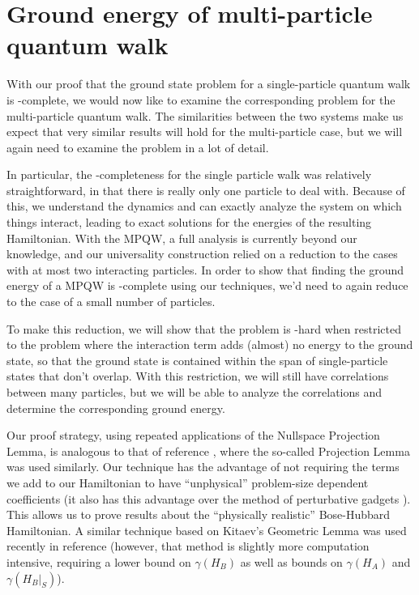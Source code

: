 \documentclass[../thesis-main/thesis-main]{subfiles}
\begin{document}
\chapter{Ground energy of multi-particle quantum walk}
\label{chap:MP_ground}



With our proof that the ground state problem for a single-particle quantum walk is \QMA-complete, we would now like to examine the corresponding problem for the multi-particle quantum walk.  The similarities between the two systems make us expect that very similar results will hold for the multi-particle case, but we will again need to examine the problem in a lot of detail.

In particular, the \QMA-completeness for the single particle walk was relatively straightforward, in that there is really only one particle to deal with.  Because of this, we understand the dynamics and can exactly analyze the system on which things interact, leading to exact solutions for the energies of the resulting Hamiltonian.  With the MPQW, a full analysis is currently beyond our knowledge, and our universality construction relied on a reduction to the cases with at most two interacting particles.  In order to show that finding the ground energy of a MPQW is \QMA-complete using our techniques, we'd need to again reduce to the case of a small number of particles.

To make this reduction, we will show that the problem is \QMA-hard when restricted to the problem where the interaction term adds (almost) no energy to the ground state, so that the ground state is contained within the span of single-particle states that don't overlap.  With this restriction, we will still have correlations between many particles, but we will be able to analyze the correlations and determine the corresponding ground energy.


Our proof strategy, using repeated applications of the Nullspace Projection Lemma, is analogous to that of reference \cite{KKR04}, where the so-called Projection Lemma was used similarly. Our technique has the advantage of not requiring the terms we add to our Hamiltonian to have ``unphysical'' problem-size dependent coefficients (it also has this advantage over the method of perturbative gadgets \cite{KKR04,JF08}). This allows us to prove results about the ``physically realistic'' Bose-Hubbard Hamiltonian. A similar technique based on Kitaev's Geometric Lemma was used recently in reference \cite{GN13} (however, that method is slightly more computation intensive, requiring a lower bound on $\gamma(H_{B})$ as well as bounds on $\gamma(H_{A})$ and $\gamma(H_{B}|_{S})$).
\end{document}
